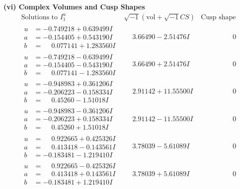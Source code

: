 \documentclass[1p]{elsarticle_modified}
\theoremstyle{definition}
\newcommand{\I}{\sqrt{-1}}
\begin{document}
\newpage\flushleft \textbf{(vi) Complex Volumes and Cusp Shapes}
$$\begin{array}{c|c|c}  
\text{Solutions to }I^u_{1}& \I (\text{vol} + \sqrt{-1}CS) & \text{Cusp shape}\\
 \hline 
\begin{aligned}
u &= -0.749218 + 0.639499 I \\
a &= -0.154405 + 0.543190 I \\
b &= \phantom{-}0.077141 + 1.283560 I\end{aligned}
 & \phantom{-}3.66490 - 2.51476 I & \phantom{-0.000000 } 0 \\ \hline\begin{aligned}
u &= -0.749218 - 0.639499 I \\
a &= -0.154405 - 0.543190 I \\
b &= \phantom{-}0.077141 - 1.283560 I\end{aligned}
 & \phantom{-}3.66490 + 2.51476 I & \phantom{-0.000000 } 0 \\ \hline\begin{aligned}
u &= -0.948983 + 0.361206 I \\
a &= -0.206223 - 0.158334 I \\
b &= \phantom{-}0.45260 - 1.51018 I\end{aligned}
 & \phantom{-}2.91142 + 11.55500 I & \phantom{-0.000000 } 0 \\ \hline\begin{aligned}
u &= -0.948983 - 0.361206 I \\
a &= -0.206223 + 0.158334 I \\
b &= \phantom{-}0.45260 + 1.51018 I\end{aligned}
 & \phantom{-}2.91142 - 11.55500 I & \phantom{-0.000000 } 0 \\ \hline\begin{aligned}
u &= \phantom{-}0.922665 + 0.425326 I \\
a &= \phantom{-}0.413418 - 0.143561 I \\
b &= -0.183481 - 1.219410 I\end{aligned}
 & \phantom{-}3.78039 - 5.61089 I & \phantom{-0.000000 } 0 \\ \hline\begin{aligned}
u &= \phantom{-}0.922665 - 0.425326 I \\
a &= \phantom{-}0.413418 + 0.143561 I \\
b &= -0.183481 + 1.219410 I\end{aligned}
 & \phantom{-}3.78039 + 5.61089 I & \phantom{-0.000000 } 0 \\ \hline\begin{aligned}

\end{aligned}
\end{array}$$
\end{document}
